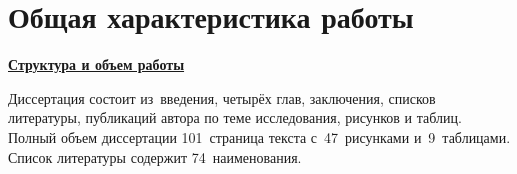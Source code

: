 \section*{Общая характеристика работы}

\newcommand{\actuality}{\pdfbookmark[1]{Актуальность}{actuality}\underline{\textbf{\actualityTXT}}}
\newcommand{\progress}{\pdfbookmark[1]{Разработанность темы}{progress}\underline{\textbf{\progressTXT}}}
\newcommand{\aim}{\pdfbookmark[1]{Цели}{aim}\underline{{\textbf\aimTXT}}}
\newcommand{\tasks}{\pdfbookmark[1]{Задачи}{tasks}\underline{\textbf{\tasksTXT}}}
\newcommand{\aimtasks}{\pdfbookmark[1]{Цели и задачи}{aimtasks}\aimtasksTXT}
\newcommand{\novelty}{\pdfbookmark[1]{Научная новизна}{novelty}\underline{\textbf{\noveltyTXT}}}
\newcommand{\influence}{\pdfbookmark[1]{Практическая значимость}{influence}\underline{\textbf{\influenceTXT}}}
\newcommand{\methods}{\pdfbookmark[1]{Методология и методы исследования}{methods}\underline{\textbf{\methodsTXT}}}
\newcommand{\defpositions}{\pdfbookmark[1]{Основные положения, выносимые на защиту}{defpositions}\underline{\textbf{\defpositionsTXT}}}
\newcommand{\reliability}{\pdfbookmark[1]{Достоверность}{reliability}\underline{\textbf{\reliabilityTXT}}}
\newcommand{\probation}{\pdfbookmark[1]{Апробация}{probation}\underline{\textbf{\probationTXT}}}
\newcommand{\contribution}{\pdfbookmark[1]{Личный вклад}{contribution}\underline{\textbf{\contributionTXT}}}
\newcommand{\publications}{\pdfbookmark[1]{Публикации}{publications}\underline{\textbf{\publicationsTXT}}}
\newcommand{\structureandsize}{\pdfbookmark[1]{Структура и объем работы}{structureandsize}\underline{\textbf{\structureandsizeTXT}}}



\underline{\textbf{Структура и объем работы}}

Диссертация состоит из~введения,
четырёх глав, заключения, списков литературы, публикаций автора по теме исследования, рисунков и таблиц. Полный объем диссертации
101~страница текста с~47~рисунками и~9~таблицами. Список
литературы содержит 74~наименования.

